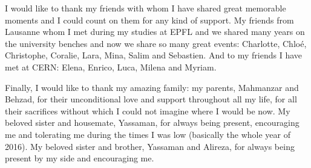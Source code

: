 I would like to thank my friends with whom I have shared great
memorable moments and I could count on them for any kind of
support. My friends from Lausanne whom I met during my studies at EPFL
and we shared many years on the university benches and now we share so
many great events: Charlotte, Chloé, Christophe, Coralie, Lara, Mina,
Salim and Sebastien. And to my friends I have met at CERN: Elena,
Enrico, Luca, Milena and Myriam.

Finally, I would like to thank my amazing family: my parents,
Mahmanzar and Behzad, for their unconditional love and support
throughout all my life, for all their sacrifices without which I could
not imagine where I would be now. My beloved sister and housemate,
Yassaman, for always being present, encouraging me and tolerating me
during the times I was low (basically the whole year of 2016). My
beloved sister and brother, Yassaman and Alireza, for always being
present by my side and encouraging me.



